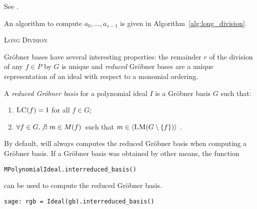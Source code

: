 \begin{citeproof}
See \cite[p.62ff]{Cox2005}. 
\end{citeproof}

An algorithm to compute $a_0,\dots,a_{s-1}$ is given in Algorithm~\ref{alg:long_division}.

\begin{algorithm}[ht]

\caption{\textsc{Long Division}} 
\label{alg:long_division}
\end{algorithm} 




Gröbner bases have several interesting properties: the remainder $r$ of the division of any $f \in P$ by $G$ is
unique and \emph{reduced} Gröbner bases are a unique representation of an ideal with respect to a monomial ordering.

\begin{definition}
A \emph{reduced Gröbner basis} for a polynomial ideal $I$ is a
Gröbner basis $G$ such that:
\begin{enumerate}
\item $\textsc{LC}(f) = 1$ for all $f \in G$;
\item $\forall f \in G, \not\exists\ m \in M(f)$\ such that $m \in \langle \textsc{LM}(G
\setminus \{f\})\rangle$ .
\end{enumerate}
\end{definition}

By default, \Sage will always computes the reduced Gröbner basis when computing a Gröbner basis. If a Gröbner basis was obtained by other means, the function 
\begin{lstlisting}
MPolynomialIdeal.interreduced_basis()
\end{lstlisting}
can be used to compute the reduced Gröbner basis.
\begin{lstlisting}
sage: rgb = Ideal(gb).interreduced_basis()
\end{lstlisting}

